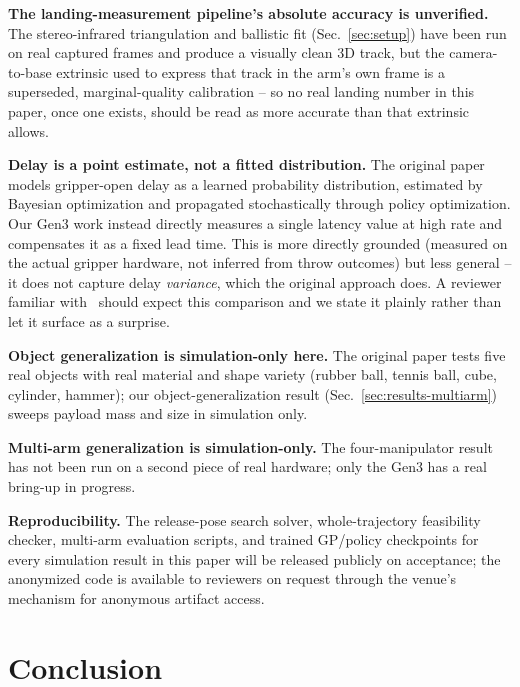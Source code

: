 \documentclass[conference]{IEEEtran}
\begin{document}
\textbf{The landing-measurement pipeline's absolute accuracy is
unverified.} The stereo-infrared triangulation and ballistic fit
(Sec.~\ref{sec:setup}) have been run on real captured frames and produce a
visually clean 3D track, but the camera-to-base extrinsic used to express
that track in the arm's own frame is a superseded, marginal-quality
calibration -- so no real landing number in this paper, once one exists,
should be read as more accurate than that extrinsic allows.

\textbf{Delay is a point estimate, not a fitted distribution.} The
original paper models gripper-open delay as a learned probability
distribution, estimated by Bayesian optimization and propagated
stochastically through policy optimization. Our Gen3 work instead directly
measures a single latency value at high rate and compensates it as a fixed
lead time. This is more directly grounded (measured on the actual gripper
hardware, not inferred from throw outcomes) but less general -- it does not
capture delay \emph{variance}, which the original approach does. A
reviewer familiar with~\cite{turcato2025mcpilot} should expect this
comparison and we state it plainly rather than let it surface as a
surprise.

\textbf{Object generalization is simulation-only here.} The original paper
tests five real objects with real material and shape variety (rubber ball,
tennis ball, cube, cylinder, hammer); our object-generalization result
(Sec.~\ref{sec:results-multiarm}) sweeps payload mass and size in
simulation only.

\textbf{Multi-arm generalization is simulation-only.} The four-manipulator
result has not been run on a second piece of real hardware; only the Gen3
has a real bring-up in progress.

\textbf{Reproducibility.} The release-pose search solver, whole-trajectory
feasibility checker, multi-arm evaluation scripts, and trained GP/policy
checkpoints for every simulation result in this paper will be released
publicly on acceptance; the anonymized code is available to reviewers on
request through the venue's mechanism for anonymous artifact access.

\section{Conclusion}
\end{document}

